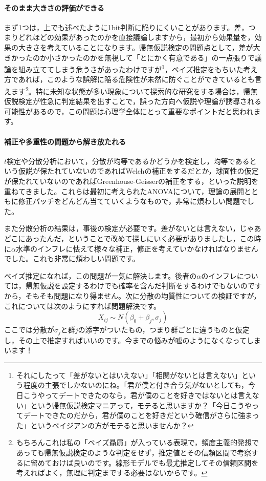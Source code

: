 \documentclass{ltjsarticle}
\begin{document}
\paragraph{そのまま大きさの評価ができる}
まず1つは，上でも述べたように1bit判断に陥りにくいことがあります。差，つまりどれほどの効果があったのかを直接議論しますから，最初から効果量を，効果の大きさを考えていることになります。帰無仮説検定の問題点として，差が大きかったのか小さかったのかを無視して「とにかく有意である」の一点張りで議論を組み立ててしまう危うさがあったわけですが\footnote{それにしたって「差がないとはいえない」「相関がないとは言えない」という程度の主張でしかないのにね。「君が僕と付き合う気がないとしても，今日こうやってデートできたのなら，君が僕のことを好きではないとは言えない」という帰無仮説検定マニアって，モテると思いますか？「今日こうやってデートできたのだから，君が僕のことを好きだという確信がさらに強まった」というベイジアンの方がモテると思いませんか？}，ベイズ推定をもちいた考え方であれば，このような誤解に陥る危険性が未然に防ぐことができているとも言えます\footnote{もちろんこれは私の「ベイズ贔屓」が入っている表現で，頻度主義的発想であっても帰無仮説検定のような判定をせず，推定値とその信頼区間で考察するに留めておけば良いのです。線形モデルでも最尤推定してその信頼区間を考えればよく，無理に判定までする必要はないからです。}。特に未知な状態が多い現象について探索的な研究をする場合は，帰無仮説検定が性急に判定結果を出すことで，誤った方向へ仮説や理論が誘導される可能性があるので，この問題は心理学全体にとって重要なポイントだと思われます。
\paragraph{補正や多重性の問題から解き放たれる}
$t$検定や分散分析において，分散が均等であるかどうかを検定し，均等であるという仮説が保たれていないのであればWelchの補正をするだとか，球面性の仮定が保たれていないのであればGreenhouse-Geisserの補正をする，といった説明を重ねてきました。これらは最初に考えられたANOVAについて，理論の展開とともに修正パッチをどんどん当てていくようなもので，非常に煩わしい問題でした。

また分散分析の結果は，事後の検定が必要です。差がないとは言えない，じゃあどこにあったんだ，ということで改めて探しにいく必要がありましたし，この時に$\alpha$水準のインフレに怯えて様々な補正，修正を考えていかなければなりませんでした。これも非常に煩わしい問題です。

ベイズ推定になれば，この問題が一気に解決します。後者の$\alpha$のインフレについては，帰無仮説を設定するわけでも確率を含んだ判断をするわけでもないのですから，そもそも問題になり得ません。次に分散の均質性についての検証ですが，これについては次のようにすれば問題解決です。
$$ X_{ij} \sim N(\beta_0 + \beta_j, \sigma_j)$$
ここでは分散が$\sigma_j$と群$j$の添字がついたもの，つまり群ごとに違うものと仮定し，その上で推定すればいいのです。今までの悩みが嘘のようになくなってしまいます！
\end{document}
